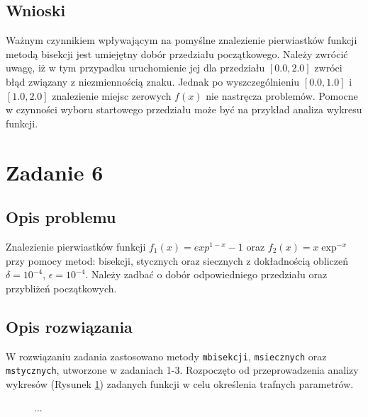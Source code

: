 \documentclass{classrep}
\begin{document}
	\subsection{Wnioski}
		Ważnym czynnikiem wpływającym na pomyślne znalezienie pierwiastków funkcji metodą bisekcji jest umiejętny dobór przedziału początkowego. Należy zwrócić uwagę, iż w tym przypadku uruchomienie jej dla przedziału $[0.0,2.0]$ zwróci błąd związany z niezmiennością znaku. Jednak po wyszczególnieniu $[0.0,1.0]$ i $[1.0,2.0]$ znalezienie miejsc zerowych $f(x)$ nie nastręcza problemów. Pomocne w czynności wyboru startowego przedziału może być na przykład analiza wykresu funkcji.
		
\section{Zadanie 6}
	\subsection{Opis problemu}
		Znalezienie pierwiastków funkcji $f_1(x)=exp^{1-x}-1$ oraz $f_2(x)=x\exp^{-x}$ przy pomocy metod: bisekcji, stycznych oraz siecznych z dokładnością obliczeń $\delta=10^{-4}$, $\epsilon=10^{-4}$. Należy zadbać o dobór odpowiedniego przedziału oraz przybliżeń początkowych.
		
	\subsection{Opis rozwiązania}
		W rozwiązaniu zadania zastosowano metody \texttt{mbisekcji}, \texttt{msiecznych} oraz \texttt{mstycznych}, utworzone w zadaniach 1-3.
		Rozpoczęto od przeprowadzenia analizy wykresów (Rysunek \ref{fig:2}) zadanych funkcji w celu określenia trafnych parametrów.
		
		\begin{figure}[!htbp]
			\centering
			 \hfill
  			\caption{...}
  			\label{fig:2}
		\end{figure}		
		
\end{document}
